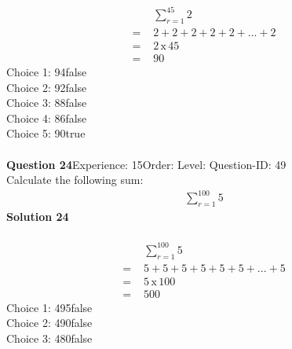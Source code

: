 \documentclass{article}
\begin{document}
\\[-35pt]\begin{align*}
&\sum_{r=1}^{45} 2\\[2pt]
=\,\,&2+2+2+2+2+...+2\\[2pt]
=\,\,&2 \, \text{x} \, 45\\[2pt]
=\,\,&90
\end{align*}
Choice 1: \hspace{20pt}94\hspace{20pt}false\\
Choice 2: \hspace{20pt}92\hspace{20pt}false\\
Choice 3: \hspace{20pt}88\hspace{20pt}false\\
Choice 4: \hspace{20pt}86\hspace{20pt}false\\
Choice 5: \hspace{20pt}90\hspace{20pt}true\\
\\[4pt]
\noindent\textbf{Question 24}\hspace{20pt}Experience: 15\hspace{20pt}Order: \hspace{20pt}Level: \hspace{20pt}Question-ID: 49\\[2pt]
Calculate the following sum:
\begin{align*}
\sum_{r=1}^{100} 5
\end{align*}
\noindent\textbf{Solution 24}\\[2pt]
\\[-35pt]\begin{align*}
&\sum_{r=1}^{100} 5\\[2pt]
=\,\,&5+5+5+5+5+5+...+5\\[2pt]
=\,\,&5 \, \text{x} \, 100\\[2pt]
=\,\,&500
\end{align*}
Choice 1: \hspace{20pt}495\hspace{20pt}false\\
Choice 2: \hspace{20pt}490\hspace{20pt}false\\
Choice 3: \hspace{20pt}480\hspace{20pt}false\\
\end{document}
